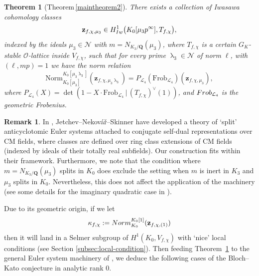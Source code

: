\documentclass[10pt,letterpaper]{amsart}
\theoremstyle{plain}
\newtheorem{thm}{Theorem}[subsection] %
\theoremstyle{definition}
\newtheorem*{rmk*}{Remark}
\theoremstyle{definition}
\theoremstyle{plain}
\theoremstyle{plain}
\theoremstyle{plain}
\theoremstyle{remark}
\numberwithin{equation}{section}
\DeclareMathOperator{\la}{\lambda}
\def\cL{{\mathcal L}}
\newcommand{\Q}{\mathbf{Q}}
\begin{document}
{\begin{thm}[Theorem\,\ref{maintheorem2}]
\label{thmA} 
There exists a collection of Iwasawa cohomology classes
\[
\mathbf{z}_{f,\chi,\mu_3}\in H^1_{\rm Iw}\bigl(K_0[\mu_3 p^\infty],T_{f,\chi}\bigr),
\] 
indexed by the ideals $\mu_3\in\mathcal{N}$ with $m=N_{K_3/\Q}(\mu_3)$, where $T_{f,\chi}$ is a certain $G_K$-stable $\mathcal{O}$-lattice inside $V_{f,\chi}$,
such that for every prime $\la_3\in \mathcal{N}$ of norm $\ell$, with $(\ell,mp)=1$ we have the norm relation
\begin{equation*}
    \mathrm{Norm}_{K_0[\mu_3]}^{K_0[\mu_3\la_3]}(\mathbf{z}_{f,\chi,\mu_3\la_3})=P_{\cL_4}(\mathrm{Frob}_{\cL_4})(\mathbf{z}_{f,\chi,\mu_3}),
\end{equation*}
where $P_{\cL_4}(X)=\det(1-X\cdot \mathrm{Frob}_{\cL_4}\,|\,(T_{f,\chi})^\vee(1))$, and ${\rm Frob}_{\cL_4}$ is the geometric Frobenius.
\end{thm}

\begin{rmk*}
In \cite{JNS}, Jetchev--Nekov{\'a}{\v{r}}--Skinner have developed a theory of `split' anticyclotomic Euler systems attached to conjugate self-dual representations over CM fields, where classes are defined over ring class extensions of CM fields (indexed by ideals of their totally real subfields). Our construction fits within their framework. Furthermore, we note that the condition where $m=N_{K_3/\Q}(\mu_3)$ splits in $K_0$ does exclude the setting when $m$ is inert in $K_3$ and $\mu_3$ splits in $K_0$. Nevertheless, this does not affect the application of the \cite{JNS} machinery (see some details for the imaginary quadratic case in \cite[\S{4.3}]{Do-PhD}).
\end{rmk*}

Due to its geometric origin, if we let
\[
\kappa_{f,\chi}:={\rm Norm}^{K_0[1]}_{K_0}(\mathbf{z}_{f,\chi,(1)})
\]
then it will land in a Selmer subgroup of $H^1(K_0,V_{f,\chi})$ with `nice' local conditions (see Section \ref{subsec:local-condition}). Then feeding Theorem~\ref{thmA} to the general Euler system machinery of \cite{JNS}, we deduce the following cases of the Bloch--Kato conjecture in analytic rank $0$.

}
\end{document}
